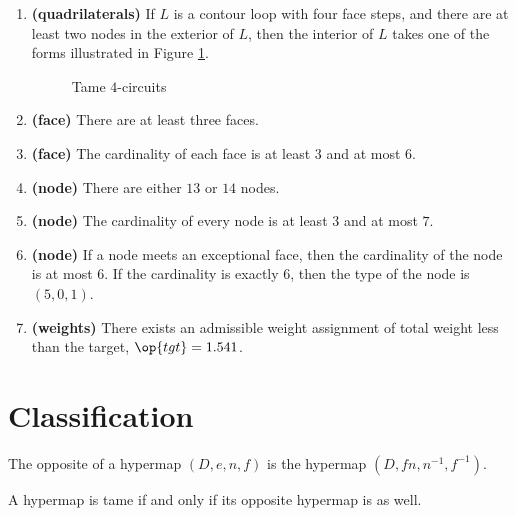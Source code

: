 \begin{enumerate}
    \item {\bf (quadrilaterals)} If $L$ is a contour loop with four face steps, and there are at least two nodes
    in the exterior of $L$, then the interior of $L$ takes one of the forms
    illustrated in Figure
    \ref{fig:fourcircuit}.
    \label{definition:tame:4-circuit}
    \begin{figure}[htb]
        \centering
        \caption{Tame $4$-circuits}
        \label{fig:fourcircuit}
    \end{figure}
  \item {\bf (face)} There are at least three faces.
    \item {\bf (face)} The cardinality of each face is at least $3$ and at most $6$.
    \label{definition:tame:length}
    \item {\bf (node)} There are either $13$ or $14$ nodes.
    \item {\bf (node)} The cardinality of every node is at least $3$ and at most
    $7$.
    \label{definition:tame:degree}
    \item {\bf (node)} If a node meets an exceptional face,
        then the cardinality of the node is at most $6$.  If the
        cardinality is exactly $6$, then the type of the node
        is $(5,0,1)$.
    \label{definition:tame:degreeE}
    \item {\bf (weights)} There exists an admissible weight assignment
        of total weight less than the target, $\op{tgt}=1.541$.
    \label{definition:tame:squander}
\end{enumerate}
%

\section{Classification}
    \label{sec:proof-classification}

\label{sec:classification}




\begin{definition}[opposite] The opposite of a hypermap $(D,e,n,f)$ is the
hypermap $(D,f n,n^{-1},f^{-1})$.
\end{definition}

\begin{lemma}\label{140} 
A hypermap is tame if and only if its opposite hypermap is as well.
\end{lemma}

